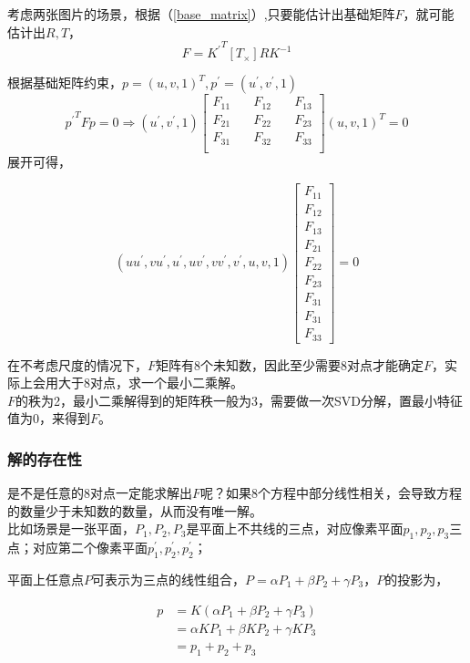 	考虑两张图片的场景，根据（\ref{base_matrix}）,只要能估计出基础矩阵$F$，就可能估计出$R,T$，
	$$
		F = {K^{\prime}}^T [T_{\times}] RK^{-1}
	$$

	根据基础矩阵约束，$p=(u,v,1)^T,p^{\prime} = (u^{\prime}, v^{\prime},1)$
	$$
		{p^{\prime}}^T F p = 0 \Rightarrow (u^{\prime}, v^{\prime},1)
		\begin{bmatrix}
			F_{11}\quad& F_{12}\quad& F_{13}\\
			F_{21}\quad& F_{22}\quad& F_{23}\\
			F_{31}\quad& F_{32}\quad& F_{33}\\
		\end{bmatrix}
		(u,v,1)^T = 0
	$$
	展开可得，

	$$
		\left(uu^{\prime}, vu^{\prime}, u^{\prime}, uv^{\prime},vv^{\prime},v^{\prime},u,v,1\right)
		\begin{bmatrix*}
			F_{11}\\
			F_{12}\\
			F_{13}\\
			F_{21}\\
			F_{22}\\
			F_{23}\\
			F_{31}\\
			F_{31}\\
			F_{33}
		\end{bmatrix*} = 0
	$$

	在不考虑尺度的情况下，$F$矩阵有8个未知数，因此至少需要8对点才能确定$F$，实际上会用大于8对点，求一个最小二乘解。\\

	$F$的秩为2，最小二乘解得到的矩阵秩一般为3，需要做一次SVD分解，置最小特征值为0，来得到$F$。

	\subsubsection*{解的存在性}
		是不是任意的8对点一定能求解出$F$呢？如果8个方程中部分线性相关，会导致方程的数量少于未知数的数量，从而没有唯一解。\\

		比如场景是一张平面，$P_1,P_2,P_3$是平面上不共线的三点，对应像素平面$p_1,p_2,p_3$三点；对应第二个像素平面$p^\prime_1,p^\prime_2,p^\prime_2$；

		平面上任意点$P$可表示为三点的线性组合，$P=\alpha P_1 + \beta P_2 + \gamma P_3$，$P$的投影为，
		
		\begin{align*}
			p &= K\left(\alpha P_1 + \beta P_2 + \gamma P_3\right)\\
				&= \alpha KP_1 + \beta K P_2 + \gamma KP_3\\
				&= p_1 + p_2 + p_3
		\end{align*}

